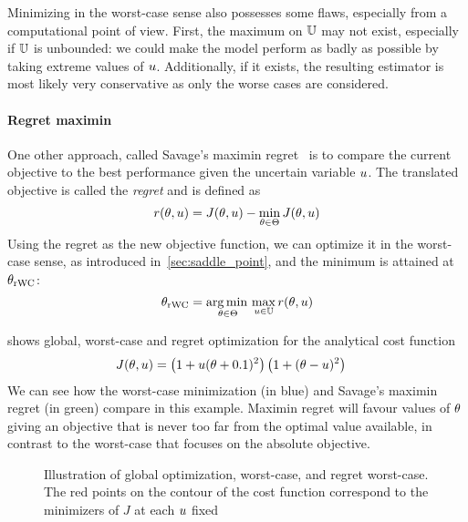 \documentclass[../../Main_ManuscritThese.tex]{subfiles}
\newcommand\imgpath{/home/victor/acadwriting/Manuscrit/Text/Chapter3/img/}
\begin{document}
Minimizing in the worst-case sense also possesses some flaws, especially from a computational point of view.
First, the maximum on $\mathbb{U}$ may not exist, especially if $\mathbb{U}$ is unbounded: we could make the model perform as badly as possible by taking extreme values of $u$. 
Additionally, if it exists, the resulting estimator is most likely very conservative as only the worse cases are considered.

\paragraph{Regret maximin}
\label{ssec:regret_savage}
One other approach, called Savage's maximin regret~\cite{savage_theory_1951} is to compare the current objective to the best performance given the uncertain variable $u$. The translated objective is called the \emph{regret} and is defined as
\begin{equation}
  \label{eq:def_regret_savage}
  r(\theta, u) = J(\theta, u) - \min_{\theta \in \Theta} J(\theta, u)
\end{equation}
Using the regret as the new objective function, we can optimize it in the worst-case sense, as introduced in~\cref{sec:saddle_point}, and the minimum is attained at ${\theta}_{\mathrm{rWC}}$:
\begin{equation}
  {\theta}_{\mathrm{rWC}} = \operatorname*{arg\,min \,}_{\theta\in\Theta} \max_{u \in \mathbb{U}} r(\theta, u)
\end{equation}

\begin{example}
 shows global, worst-case and regret optimization for the analytical cost function
\begin{align}
  \label{eq:decision_under_unc}
  J(\theta, u) &= \left(1 + u(\theta + 0.1)^2\right)\left(1 + (\theta - u)^2\right)
\end{align}
We can see how the worst-case minimization (in blue) and Savage's maximin regret (in green) compare in this example. Maximin regret will favour values of $\theta$ giving an objective that is never too far from the optimal value available, in contrast to the worst-case that focuses on the absolute objective.
\end{example}

\begin{figure}[ht]
  \centering
  
  \caption[Robust optimisation under uncertainty set]{\label{fig:decision_under_uncertainty} Illustration of global optimization, worst-case, and regret worst-case. The red points on the contour of the cost function correspond to the minimizers of $J$ at each $u$ fixed}
\end{figure}
\end{document}

